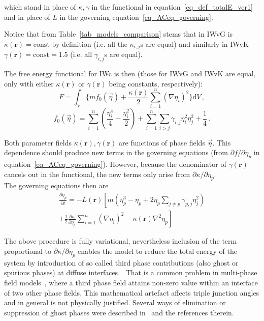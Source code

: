 		which stand in place of $\kappa,\gamma$ in the functional in equation~\eqref{eq_def_totalE_ver1} and in place of $L$ in the governing equation~\eqref{eq_ACeq_governing}.
		
		Notice that from Table~\ref{tab_models_comparison} stems  that in IWvG is $\kappa(\bm{r})=\mathrm{const}$ by definition (i.e. all the $\kappa_{i,j}$s are equal) and similarly in IWvK $\gamma(\bm{r})=\mathrm{const}=1.5$ (i.e. all $\gamma_{i,j}$s are equal). 
		
		The free energy functional for IWc is then (those for IWvG and IWvK are equal, only with either $\kappa(\bm{r})$ or $\gamma(\bm{r})$ being constants, respectively):
		\begin{equation} \label{eq_def_totalE_ver2}
			F = \int_V \Bigg\{ m f_0(\vec{\eta}) + \frac{\kappa(\bm{r})}{2}\sum_{i=1}^n(\nabla \eta_i)^2 \Bigg\} \mathrm{d}V \,,
		\end{equation}
		\begin{equation}
			f_0(\vec{\eta}) = \sum_{i=1}^n\left(\frac{\eta_i^4}{4} - \frac{\eta_i^2}{2} \right) +\sum_{i=1}^n\sum_{i>j}\gamma_{i,j}\eta_i^2\eta_j^2 + \frac{1}{4} \,.
		\end{equation}
		
		Both parameter fields $\kappa(\bm{r}),\gamma(\bm{r})$ are functions of phase fields $\vec{\eta}$. This dependence should produce new terms in the governing equations (from $\partial f/\partial \eta_p$ in equation~\eqref{eq_ACeq_governing}). However, because the denominator of $\gamma(\bm{r})$ cancels out in the functional, the new terms only arise from $\partial \kappa/\partial \eta_p$.\\
		The governing equations then are 
		\begin{equation}
			\begin{split}
				\frac{\partial \eta_p}{\partial t} = -L(\bm{r})\left[ m\left( \eta_p^3-\eta_p +  2\eta_p\sum_{j\neq p}\gamma_{p,j}\eta_j^2 \right) \right. \\ \left. +\frac{1}{2}\frac{\partial \kappa}{\partial\eta_p}\sum_{i=1}^n(\nabla\eta_i)^2 - \kappa(\bm{r})\nabla^2\eta_p \right] 
			\end{split}
		\end{equation}
		
		The above procedure is fully variational, nevertheless inclusion of the term proportional to $\partial \kappa/\partial \eta_p$ enables the model to reduce the total energy of the system by introduction of so called third phase contributions (also ghost or spurious phases) at diffuse interfaces.~\cite{Moelans2008} That is a common problem in multi-phase field models~\cite{Toth2015}, where a third phase field attains non-zero value within an interface of two other phase fields. This mathematical artefact affects triple junction angles and in general is not physically justified. Several ways of elimination or suppression of ghost phases were described in~\cite{Toth2015} and the references therein.
		
